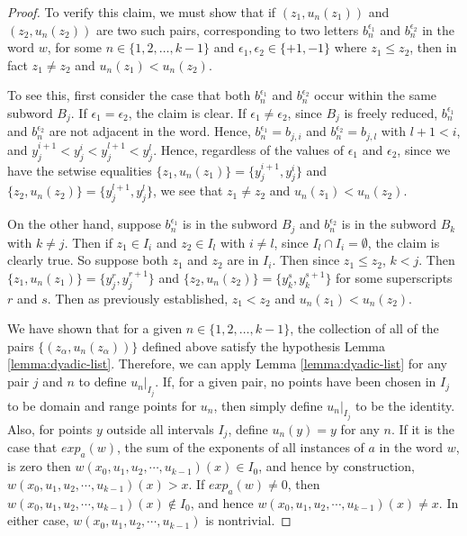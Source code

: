 \documentclass[11pt]{amsart}
\begin{document}
\begin{proof}
To verify this claim, we must show that if
$(z_1,u_n(z_1))$ and $(z_2,u_n(z_2))$ are two such pairs,
corresponding to two letters $b_n^{\epsilon_1}$ and
$b_n^{\epsilon_2}$ in the word $w$, for some $n \in\{1, 2, \ldots,
k-1\}$ and $\epsilon_1,\epsilon_2 \in \{+1,-1\}$ where $z_1 \leq
z_2$, then in fact $z_1 \neq z_2$ and $u_n(z_1) < u_n(z_2)$.

To see this, first consider the case that both $b_n^{\epsilon_1}$
and $b_n^{\epsilon_2}$ occur within the same subword $B_j$. If
$\epsilon_1=\epsilon_2$, the claim is clear. If $\epsilon_1 \neq
\epsilon_2$, since $B_j$ is freely reduced, $b_n^{\epsilon_1}$ and
$b_n^{\epsilon_2}$ are not adjacent in the word. Hence,
$b_n^{\epsilon_1}=b_{j,i}$ and $b_n^{\epsilon_2}=b_{j,l}$ with
$l+1<i$, and $y_j^{i+1}<y_j^i<y_j^{l+1}<y_j^l$. Hence, regardless
of the values of $\epsilon_1$ and $\epsilon_2$, since we have the
setwise equalities $\{z_1, u_n(z_1)\}=\{y_j^{i+1},y_j^{i}\}$ and
$\{z_2, u_n(z_2)\}=\{y_j^{l+1},y_j^{l}\}$, we see that $z_1 \neq
z_2$ and $u_n(z_1)<u_n(z_2)$.

On the other hand, suppose $b_n^{\epsilon_1}$
is in the subword $B_j$ and $b_n^{\epsilon_2}$ is in the subword
$B_k$ with $k\neq j$. Then if $z_1\in I_i$ and $z_2 \in I_l$ with
$i \neq l$, since $I_l \cap I_i=\emptyset$, the claim is clearly
true. So suppose both $z_1$ and $z_2$ are in $I_i$. Then since
$z_1 \leq z_2$, $k<j$. Then $\{z_1,
u_n(z_1)\}=\{y_j^{r},y_j^{r+1}\}$ and $\{z_2,
u_n(z_2)\}=\{y_k^{s},y_k^{s+1}\}$ for some superscripts $r$ and
$s$. Then as previously established, $z_1<z_2$ and
$u_n(z_1)<u_n(z_2)$.

We have shown that for a given $n \in \{1, 2, \dots,
k-1\}$, the collection of all of the pairs $\{(z_{\alpha},
u_n(z_{\alpha}))\}$ defined above satisfy the hypothesis Lemma
\ref{lemma:dyadic-list}.
Therefore, we can apply Lemma \ref{lemma:dyadic-list} for any pair
$j$ and $n$ to define $u_n|_{I_j}$. If, for a given pair, no
points have been chosen in $I_j$ to be domain and range points for
$u_n$, then simply define $u_n|_{I_j}$ to be the identity. Also,
for points $y$ outside all intervals $I_j$, define $u_n(y)=y$ for
any $n$. If it is the case that $exp_a(w)$, the sum of the
exponents of all instances of $a$ in the word $w$, is zero then
$w(x_0,u_1,u_2, \cdots ,u_{k-1})(x) \in I_0$, and hence by
construction, $w(x_0,u_1,u_2, \cdots ,u_{k-1})(x)>x$.  If
$exp_a(w) \neq 0$, then $w(x_0,u_1,u_2, \cdots ,u_{k-1})(x) \notin
I_0$, and hence $w(x_0,u_1,u_2, \cdots ,u_{k-1})(x) \neq x$.  In
either case, $w(x_0,u_1,u_2, \cdots ,u_{k-1})$ is nontrivial.
\end{proof}
\end{document}
